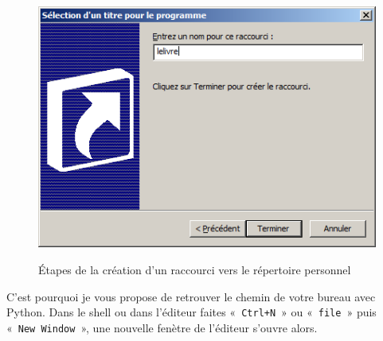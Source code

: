 \begin{figure}[h!tb]
{\includegraphics[scale=0.5]{images/comptera.png}
\label{fig:comptera}
}

\caption{Étapes de la création d'un raccourci vers le répertoire personnel}
\label{fig:etapesra}
\end{figure}


C'est pourquoi je vous propose de retrouver le chemin de votre bureau avec Python.
Dans le shell ou dans l'éditeur faites «~\texttt{Ctrl+N}~» ou «~\texttt{file}~» puis   
«~\texttt{New Window}~», une nouvelle fenètre de l'éditeur s'ouvre alors.

